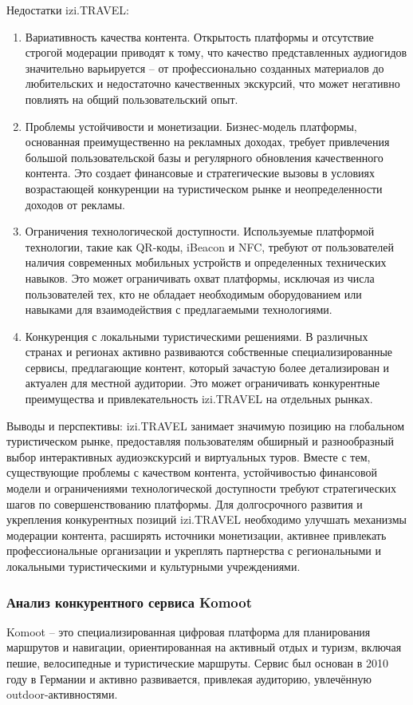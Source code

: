 Недостатки izi.TRAVEL:
\begin{enumerate}
    \item Вариативность качества контента. Открытость платформы и отсутствие строгой модерации приводят к тому, что качество представленных аудиогидов значительно варьируется – от профессионально созданных материалов до любительских и недостаточно качественных экскурсий, что может негативно повлиять на общий пользовательский опыт.
    \item Проблемы устойчивости и монетизации. Бизнес-модель платформы, основанная преимущественно на рекламных доходах, требует привлечения большой пользовательской базы и регулярного обновления качественного контента. Это создает финансовые и стратегические вызовы в условиях возрастающей конкуренции на туристическом рынке и неопределенности доходов от рекламы.
    \item Ограничения технологической доступности. Используемые платформой технологии, такие как QR-коды, iBeacon и NFC, требуют от пользователей наличия современных мобильных устройств и определенных технических навыков. Это может ограничивать охват платформы, исключая из числа пользователей тех, кто не обладает необходимым оборудованием или навыками для взаимодействия с предлагаемыми технологиями.
    \item Конкуренция с локальными туристическими решениями. В различных странах и регионах активно развиваются собственные специализированные сервисы, предлагающие контент, который зачастую более детализирован и актуален для местной аудитории. Это может ограничивать конкурентные преимущества и привлекательность izi.TRAVEL на отдельных рынках.
\end{enumerate}

Выводы и перспективы:
izi.TRAVEL занимает значимую позицию на глобальном туристическом рынке, предоставляя пользователям обширный и разнообразный выбор интерактивных аудиоэкскурсий и виртуальных туров. Вместе с тем, существующие проблемы с качеством контента, устойчивостью финансовой модели и ограничениями технологической доступности требуют стратегических шагов по совершенствованию платформы. Для долгосрочного развития и укрепления конкурентных позиций izi.TRAVEL необходимо улучшать механизмы модерации контента, расширять источники монетизации, активнее привлекать профессиональные организации и укреплять партнерства с региональными и локальными туристическими и культурными учреждениями.

\subsubsection*{Анализ конкурентного сервиса Komoot}
Komoot – это специализированная цифровая платформа для планирования маршрутов и навигации, ориентированная на активный отдых и туризм, включая пешие, велосипедные и туристические маршруты. Сервис был основан в 2010 году в Германии и активно развивается, привлекая аудиторию, увлечённую outdoor-активностями.

